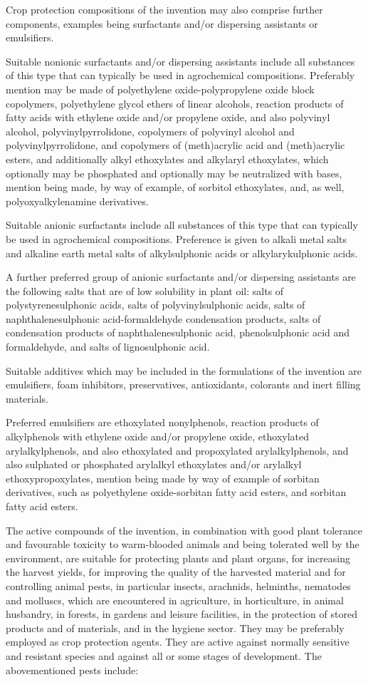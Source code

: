 \documentclass[11pt,a4paper]{article}
\begin{document}
Crop protection compositions of the invention may also comprise further components, examples being surfactants and/or dispersing assistants or emulsifiers.

Suitable nonionic surfactants and/or dispersing assistants include all substances of this type that can typically be used in agrochemical compositions. Preferably mention may be made of polyethylene oxide-polypropylene oxide block copolymers, polyethylene glycol ethers of linear alcohols, reaction products of fatty acids with ethylene oxide and/or propylene oxide, and also polyvinyl alcohol, polyvinylpyrrolidone, copolymers of polyvinyl alcohol and polyvinylpyrrolidone, and copolymers of (meth)acrylic acid and (meth)acrylic esters, and additionally alkyl ethoxylates and alkylaryl ethoxylates, which optionally may be phosphated and optionally may be neutralized with bases, mention being made, by way of example, of sorbitol ethoxylates, and, as well, polyoxyalkylenamine derivatives.

Suitable anionic surfactants include all substances of this type that can typically be used in agrochemical compositions. Preference is given to alkali metal salts and alkaline earth metal salts of alkylsulphonic acids or alkylarykulphonic acids.

A further preferred group of anionic surfactants and/or dispersing assistants are the following salts that are of low solubility in plant oil: salts of polystyrenesulphonic acids, salts of polyvinylsulphonic acids, salts of naphthalenesulphonic acid-formaldehyde condensation products, salts of condensation products of naphthalenesulphonic acid, phenolsulphonic acid and formaldehyde, and salts of lignosulphonic acid.

Suitable additives which may be included in the formulations of the invention are emulsifiers, foam inhibitors, preservatives, antioxidants, colorants and inert filling materials.

Preferred emulsifiers are ethoxylated nonylphenols, reaction products of alkylphenols with ethylene oxide and/or propylene oxide, ethoxylated arylalkylphenols, and also ethoxylated and propoxylated arylalkylphenols, and also sulphated or phosphated arylalkyl ethoxylates and/or arylalkyl ethoxypropoxylates, mention being made by way of example of sorbitan derivatives, such as polyethylene oxide-sorbitan fatty acid esters, and sorbitan fatty acid esters.

The active compounds of the invention, in combination with good plant tolerance and favourable toxicity to warm-blooded animals and being tolerated well by the environment, are suitable for protecting plants and plant organs, for increasing the harvest yields, for improving the quality of the harvested material and for controlling animal pests, in particular insects, arachnids, helminths, nematodes and molluscs, which are encountered in agriculture, in horticulture, in animal husbandry, in forests, in gardens and leisure facilities, in the protection of stored products and of materials, and in the hygiene sector. They may be preferably employed as crop protection agents. They are active against normally sensitive and resistant species and against all or some stages of development. The abovementioned pests include:
\end{document}

